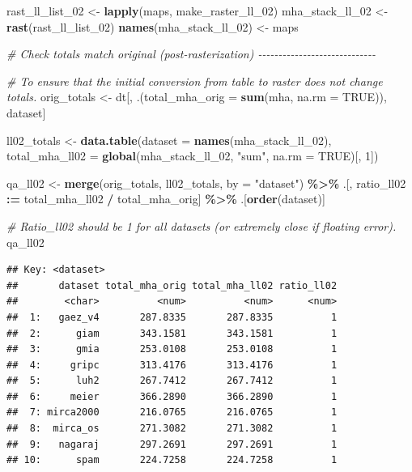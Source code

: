 \documentclass[
  11pt,
]{article}
\newenvironment{Shaded}{\begin{snugshade}}{\end{snugshade}}
\newcommand{\AttributeTok}[1]{\textcolor[rgb]{0.13,0.29,0.53}{#1}}
\newcommand{\CommentTok}[1]{\textcolor[rgb]{0.56,0.35,0.01}{\textit{#1}}}
\newcommand{\ConstantTok}[1]{\textcolor[rgb]{0.56,0.35,0.01}{#1}}
\newcommand{\DecValTok}[1]{\textcolor[rgb]{0.00,0.00,0.81}{#1}}
\newcommand{\FunctionTok}[1]{\textcolor[rgb]{0.13,0.29,0.53}{\textbf{#1}}}
\newcommand{\NormalTok}[1]{#1}
\newcommand{\OtherTok}[1]{\textcolor[rgb]{0.56,0.35,0.01}{#1}}
\newcommand{\SpecialCharTok}[1]{\textcolor[rgb]{0.81,0.36,0.00}{\textbf{#1}}}
\newcommand{\StringTok}[1]{\textcolor[rgb]{0.31,0.60,0.02}{#1}}
\begin{document}
\begin{Shaded}
\begin{Highlighting}[]
\NormalTok{rast\_ll\_list\_02 }\OtherTok{\textless{}{-}} \FunctionTok{lapply}\NormalTok{(maps, make\_raster\_ll\_02)}
\NormalTok{mha\_stack\_ll\_02 }\OtherTok{\textless{}{-}} \FunctionTok{rast}\NormalTok{(rast\_ll\_list\_02)}
\FunctionTok{names}\NormalTok{(mha\_stack\_ll\_02) }\OtherTok{\textless{}{-}}\NormalTok{ maps}

\CommentTok{\# Check totals match original (post{-}rasterization) {-}{-}{-}{-}{-}{-}{-}{-}{-}{-}{-}{-}{-}{-}{-}{-}{-}{-}{-}{-}{-}{-}{-}{-}{-}{-}{-}{-}{-}}

\CommentTok{\# To ensure that the initial conversion from table to raster does not change totals.}
\NormalTok{orig\_totals }\OtherTok{\textless{}{-}}\NormalTok{ dt[, .(}\AttributeTok{total\_mha\_orig =} \FunctionTok{sum}\NormalTok{(mha, }\AttributeTok{na.rm =} \ConstantTok{TRUE}\NormalTok{)), dataset]}

\NormalTok{ll02\_totals }\OtherTok{\textless{}{-}} \FunctionTok{data.table}\NormalTok{(}\AttributeTok{dataset =} \FunctionTok{names}\NormalTok{(mha\_stack\_ll\_02),}
                          \AttributeTok{total\_mha\_ll02 =} \FunctionTok{global}\NormalTok{(mha\_stack\_ll\_02, }\StringTok{"sum"}\NormalTok{, }
                                                  \AttributeTok{na.rm =} \ConstantTok{TRUE}\NormalTok{)[, }\DecValTok{1}\NormalTok{])}

\NormalTok{qa\_ll02 }\OtherTok{\textless{}{-}} \FunctionTok{merge}\NormalTok{(orig\_totals, ll02\_totals, }\AttributeTok{by =} \StringTok{"dataset"}\NormalTok{) }\SpecialCharTok{\%\textgreater{}\%}
\NormalTok{  .[, ratio\_ll02 }\SpecialCharTok{:=}\NormalTok{ total\_mha\_ll02 }\SpecialCharTok{/}\NormalTok{ total\_mha\_orig] }\SpecialCharTok{\%\textgreater{}\%}
\NormalTok{  .[}\FunctionTok{order}\NormalTok{(dataset)]}

\CommentTok{\# Ratio\_ll02 should be 1 for all datasets (or extremely close if floating error).}
\NormalTok{qa\_ll02}
\end{Highlighting}
\end{Shaded}

\begin{verbatim}
## Key: <dataset>
##       dataset total_mha_orig total_mha_ll02 ratio_ll02
##        <char>          <num>          <num>      <num>
##  1:   gaez_v4       287.8335       287.8335          1
##  2:      giam       343.1581       343.1581          1
##  3:      gmia       253.0108       253.0108          1
##  4:     gripc       313.4176       313.4176          1
##  5:      luh2       267.7412       267.7412          1
##  6:     meier       366.2890       366.2890          1
##  7: mirca2000       216.0765       216.0765          1
##  8:  mirca_os       271.3082       271.3082          1
##  9:   nagaraj       297.2691       297.2691          1
## 10:      spam       224.7258       224.7258          1
\end{verbatim}
\end{document}
